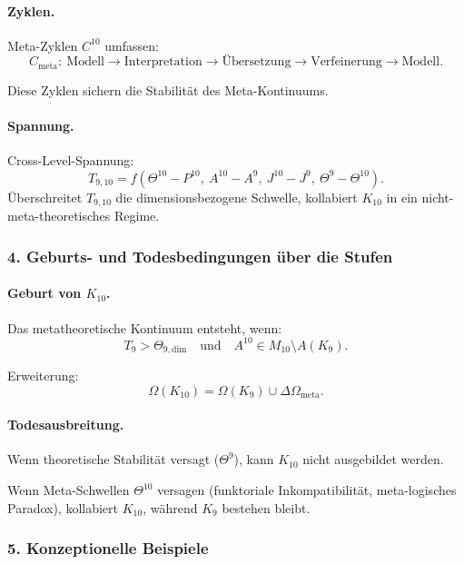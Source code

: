 \paragraph{Zyklen.}
Meta-Zyklen $C^{10}$ umfassen:
\[
C_{\mathrm{meta}}:\
\text{Modell} \rightarrow \text{Interpretation} \rightarrow \text{Übersetzung}
\rightarrow \text{Verfeinerung} \rightarrow \text{Modell}.
\]

Diese Zyklen sichern die Stabilität des Meta-Kontinuums.

\paragraph{Spannung.}
Cross-Level-Spannung:
\[
T_{9,10} =
f(\Theta^{10} - P^{10},\ A^{10} - A^9,\
  J^{10} - J^9,\ \Theta^9 - \Theta^{10}).
\]
Überschreitet $T_{9,10}$ die dimensionsbezogene Schwelle, kollabiert $K_{10}$ in ein
nicht-meta-theoretisches Regime.

\subsubsection{4. Geburts- und Todesbedingungen über die Stufen}

\paragraph{Geburt von $K_{10}$.}
Das metatheoretische Kontinuum entsteht, wenn:
\[
T_9 > \Theta_{9,\mathrm{dim}}
\quad\text{und}\quad
A^{10} \in M_{10} \setminus A(K_9).
\]

Erweiterung:
\[
\Omega(K_{10}) = \Omega(K_9) \cup \Delta\Omega_{\mathrm{meta}}.
\]

\paragraph{Todesausbreitung.}
Wenn theoretische Stabilität versagt ($\Theta^9$), kann $K_{10}$ nicht ausgebildet
werden.

Wenn Meta-Schwellen $\Theta^{10}$ versagen (funktoriale Inkompatibilität,
meta-logisches Paradox), kollabiert $K_{10}$, während $K_9$ bestehen bleibt.

\subsubsection{5. Konzeptionelle Beispiele}

